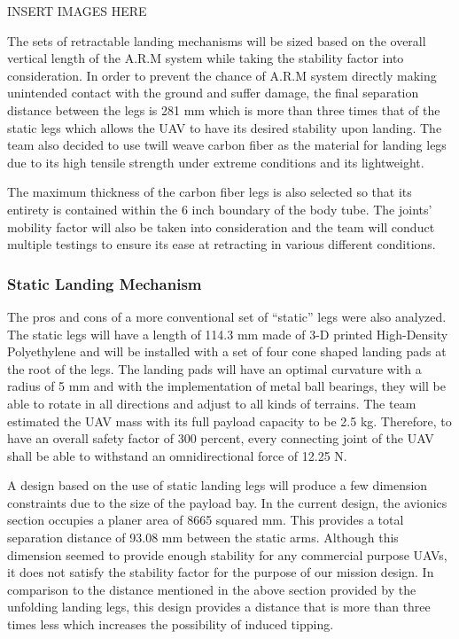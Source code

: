 			INSERT IMAGES HERE

			The sets of retractable landing mechanisms will be sized based on the overall vertical length of the A.R.M system while taking the stability factor into consideration. In order to prevent the chance of A.R.M system directly making unintended contact with the ground and suffer damage, the final separation distance between the legs is 281 mm which is more than three times that of the static legs which allows the UAV to have its desired stability upon landing. The team also decided to use twill weave carbon fiber as the material for landing legs due to its high tensile strength under extreme conditions and its lightweight. 

			The maximum thickness of the carbon fiber legs is also selected so that its entirety is contained within the 6 inch boundary of the body tube. The joints’ mobility factor will also be taken into consideration and the team will conduct multiple testings to ensure its ease at retracting in various different conditions. 


		\subsubsection{Static Landing Mechanism}
			The pros and cons of a more conventional set of “static” legs were also analyzed. The static legs will have a length of 114.3 mm made of 3-D printed High-Density Polyethylene and will be installed with a set of four cone shaped landing pads at the root of the legs. The landing pads will have an optimal curvature with a radius of 5 mm and with the implementation of metal ball bearings, they will be able to rotate in all directions and adjust to all kinds of terrains. The team estimated the UAV mass with its full payload capacity to be 2.5 kg. Therefore, to have an overall safety factor of 300 percent, every connecting joint of the UAV shall be able to withstand an omnidirectional force of 12.25 N. 

			A design based on the use of static landing legs will produce a few dimension constraints due to the size of the payload bay. In the current design, the avionics section occupies a planer area of 8665 squared mm. This provides a total separation distance of 93.08 mm between the static arms. Although this dimension seemed to provide enough stability for any commercial purpose UAVs, it does not satisfy the stability factor for the purpose of our mission design. In comparison to the distance mentioned in the above section provided by the unfolding landing legs, this design provides a distance that is more than three times less which increases the possibility of induced tipping. 

